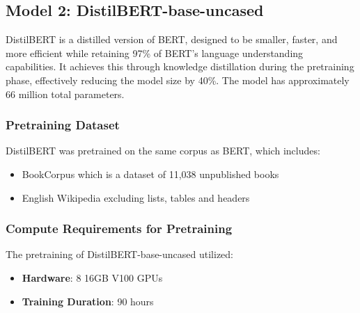 \documentclass[titlepage]{article}
\begin{document}
\subsection{Model 2: DistilBERT-base-uncased}
DistilBERT is a distilled version of BERT, designed to be smaller, faster, and more efficient while retaining 97\% of BERT's language 
understanding capabilities. It achieves this through knowledge distillation during the pretraining phase, effectively reducing the model 
size by 40\%. The model has approximately 66 million total parameters.

\subsubsection{Pretraining Dataset}
DistilBERT was pretrained on the same corpus as BERT, which includes:
\begin{itemize}
    \item BookCorpus which is a dataset of 11,038 unpublished books
    \item English Wikipedia excluding lists, tables and headers
\end{itemize}

\subsubsection{Compute Requirements for Pretraining}
The pretraining of DistilBERT-base-uncased utilized:
\begin{itemize}
    \item \textbf{Hardware}: 8 16GB V100 GPUs
    \item \textbf{Training Duration}: 90 hours
\end{itemize}
\end{document}
